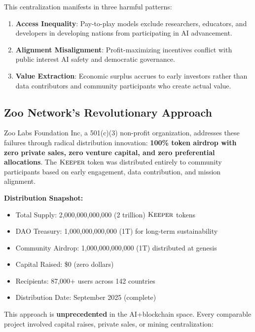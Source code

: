 \documentclass[11pt,letterpaper]{article}
\theoremstyle{definition}
\theoremstyle{remark}
\newcommand{\KEEPER}{\textsc{Keeper}}
\begin{document}
This centralization manifests in three harmful patterns:

\begin{enumerate}
\item \textbf{Access Inequality}: Pay-to-play models exclude researchers, educators, and developers in developing nations from participating in AI advancement.
\item \textbf{Alignment Misalignment}: Profit-maximizing incentives conflict with public interest AI safety and democratic governance.
\item \textbf{Value Extraction}: Economic surplus accrues to early investors rather than data contributors and community participants who create actual value.
\end{enumerate}

\subsection{Zoo Network's Revolutionary Approach}

Zoo Labs Foundation Inc, a 501(c)(3) non-profit organization, addresses these failures through radical distribution innovation: \textbf{100\% token airdrop with zero private sales, zero venture capital, and zero preferential allocations}. The $\KEEPER$ token was distributed entirely to community participants based on early engagement, data contribution, and mission alignment.

\textbf{Distribution Snapshot:}
\begin{itemize}
\item Total Supply: 2,000,000,000,000 (2 trillion) $\KEEPER$ tokens
\item DAO Treasury: 1,000,000,000,000 (1T) for long-term sustainability
\item Community Airdrop: 1,000,000,000,000 (1T) distributed at genesis
\item Capital Raised: \$0 (zero dollars)
\item Recipients: 87,000+ users across 142 countries
\item Distribution Date: September 2025 (complete)
\end{itemize}

This approach is \textbf{unprecedented} in the AI+blockchain space. Every comparable project involved capital raises, private sales, or mining centralization:
\end{document}
